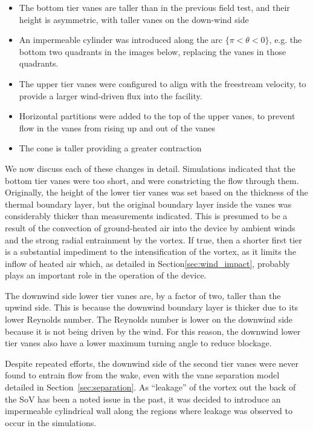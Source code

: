 \begin{itemize}
\item The bottom tier vanes are taller than in the previous field test, 
      and their height is asymmetric, with taller vanes on the down-wind side
\item An impermeable cylinder was introduced along the arc $\{\pi < \theta
      < 0 \}$, e.g. the bottom two quadrants in the images below, replacing the
vanes in those quadrants. 
\item The upper tier vanes were configured to align with the freestream
velocity, to provide a larger wind-driven flux into the facility.
\item Horizontal partitions were added to the top of the upper vanes, to
prevent flow in the vanes from rising up and out of the vanes
\item The cone is taller providing a greater contraction
\end{itemize}

We now discuss each of these changes in detail. Simulations indicated that 
the
bottom tier vanes were too short, and were constricting the flow 
through them. Originally, the height of the lower
tier vanes was set based on the thickness of the 
thermal boundary layer, but the original boundary layer inside
the vanes was considerably thicker than measurements indicated. 
This is presumed to be a result of the
convection of ground-heated air into the device by ambient winds and
the strong radial entrainment by the vortex. If true, then a shorter
first tier is a substantial impediment to the intensification of the
vortex, as it limits the inflow of heated air which, as detailed
in Section\ref{sec:wind_impact}, probably plays an important role in 
the operation of the device.

The downwind side lower tier vanes are, by a factor of two, taller 
than the upwind side. This
is because the downwind boundary layer is thicker due to its 
lower Reynolds number. The Reynolds number is lower on the
downwind side because it is not being driven by the wind.
For this reason, the downwind lower tier
vanes also have a lower maximum turning angle to reduce blockage.

Despite repeated efforts, the downwind side of the second tier vanes were
never found to entrain flow from the wake, even with the vane separation
model detailed in Section~\ref{sec:separation}. As ``leakage'' of the
vortex out the back of the SoV has been a noted issue in the past, it
was decided to introduce an impermeable cylindrical wall along the
regions where leakage was observed to occur in the simulations. 

